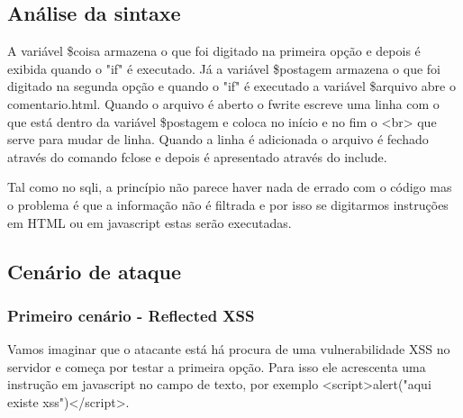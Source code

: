 \documentclass{report}
\begin{document}
\subsection{Análise da sintaxe}

A variável \$coisa armazena o que foi digitado na primeira opção e depois é exibida quando o "if" é executado. Já a variável \$postagem armazena o que foi digitado na segunda opção e quando o "if" é executado a variável \$arquivo abre o comentario.html. Quando o arquivo é aberto o fwrite escreve uma linha com o que está dentro da variável \$postagem e coloca no início e no fim o  <br> que serve para mudar de linha. Quando a linha é adicionada o arquivo é fechado através do comando fclose e depois é apresentado através do include.

Tal como no \ac{sqli}, a princípio não parece haver nada de errado com o código mas o problema é que a informação não é filtrada e por isso se digitarmos instruções em HTML ou em javascript estas serão executadas.

\subsection{Cenário de ataque}

\subsubsection{Primeiro cenário - Reflected XSS}

Vamos imaginar que o atacante está há procura de uma vulnerabilidade XSS no servidor e começa por testar a primeira opção. Para isso ele acrescenta uma instrução em javascript no campo de texto, por exemplo <script>alert("aqui existe xss")</script>.
\end{document}
